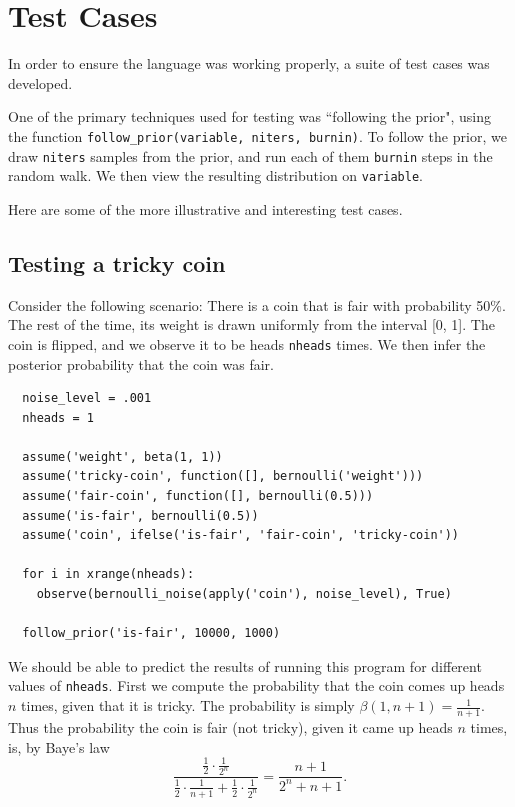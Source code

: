 \documentclass[11pt]{article}
\begin{document}

\pagebreak

\section{Test Cases}

In order to ensure the language was working properly, a suite of test cases was developed.  

One of the primary techniques used for testing was ``following the prior", using the function {\tt follow\_prior(variable, niters, burnin)}.  To follow the prior, we draw {\tt niters} samples from the prior, and run each of them {\tt burnin} steps in the random walk.  We then view the resulting distribution on {\tt variable}.  %

Here are some of the more illustrative and interesting test cases.


\subsection{Testing a tricky coin}

Consider the following scenario:  There is a coin that is fair with probability 50\%.  The rest of the time, its weight is drawn uniformly from the interval [0, 1].  The coin is flipped, and we observe it to be heads {\tt nheads} times.  We then infer the posterior probability that the coin was fair. 

\begin{small}
\begin{verbatim}
  noise_level = .001
  nheads = 1
  
  assume('weight', beta(1, 1))
  assume('tricky-coin', function([], bernoulli('weight')))
  assume('fair-coin', function([], bernoulli(0.5)))
  assume('is-fair', bernoulli(0.5))
  assume('coin', ifelse('is-fair', 'fair-coin', 'tricky-coin')) 

  for i in xrange(nheads):
    observe(bernoulli_noise(apply('coin'), noise_level), True)

  follow_prior('is-fair', 10000, 1000)
\end{verbatim}
\end{small}


We should be able to predict the results of running this program for different values of {\tt nheads}.  First we compute the probability that the coin comes up heads $n$ times, given that it is tricky.  The probability is simply $\beta(1, n + 1) = \frac{1}{n +1}$.  Thus the probability the coin is fair (not tricky), given it came up heads $n$ times, is, by Baye's law $$\frac{\frac{1}{2} \cdot \frac{1}{2^n}}{\frac{1}{2} \cdot \frac{1}{n+1} + \frac{1}{2} \cdot \frac{1}{2^n}} = \frac{n+1}{ 2^n + n+1}.$$
\end{document}
